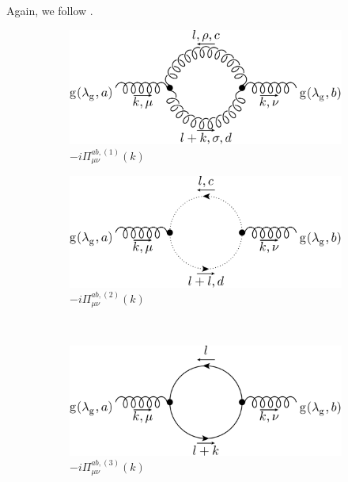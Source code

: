 Again, we follow \cite{Bojak:2000eu}.
\begin{figure}[ht!]
	\begin{subfigure}[t]{.4\textwidth}
		\includegraphics[width=\textwidth]{pyfeyn/nlo-v-seg}
		\caption{$-i\Pi_{\mu\nu}^{ab,(1)}(k)$}
	\end{subfigure}\hspace{.15\textwidth}%
	\begin{subfigure}[t]{.4\textwidth}
		\includegraphics[width=\textwidth]{pyfeyn/nlo-v-seggh}
		\caption{$-i\Pi_{\mu\nu}^{ab,(2)}(k)$}
	\end{subfigure}\\
	\begin{subfigure}[t]{.4\textwidth}
		\includegraphics[width=\textwidth]{pyfeyn/nlo-v-segq}
		\caption{$-i\Pi_{\mu\nu}^{ab,(3)}(k)$}
	\end{subfigure}\hspace{.15\textwidth}%
	\begin{subfigure}[t]{.4\textwidth}

\end{subfigure}
\end{figure}
